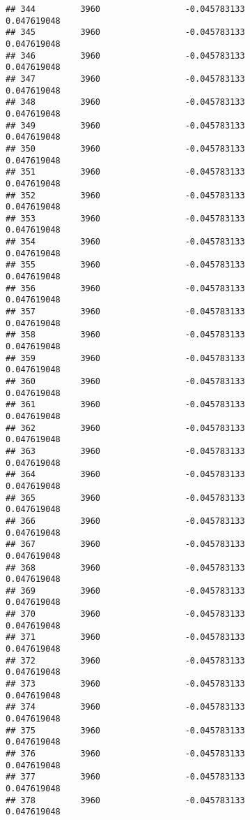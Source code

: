 \documentclass[]{article}
\begin{document}
\begin{verbatim}
## 344         3960                 -0.045783133                0.047619048
## 345         3960                 -0.045783133                0.047619048
## 346         3960                 -0.045783133                0.047619048
## 347         3960                 -0.045783133                0.047619048
## 348         3960                 -0.045783133                0.047619048
## 349         3960                 -0.045783133                0.047619048
## 350         3960                 -0.045783133                0.047619048
## 351         3960                 -0.045783133                0.047619048
## 352         3960                 -0.045783133                0.047619048
## 353         3960                 -0.045783133                0.047619048
## 354         3960                 -0.045783133                0.047619048
## 355         3960                 -0.045783133                0.047619048
## 356         3960                 -0.045783133                0.047619048
## 357         3960                 -0.045783133                0.047619048
## 358         3960                 -0.045783133                0.047619048
## 359         3960                 -0.045783133                0.047619048
## 360         3960                 -0.045783133                0.047619048
## 361         3960                 -0.045783133                0.047619048
## 362         3960                 -0.045783133                0.047619048
## 363         3960                 -0.045783133                0.047619048
## 364         3960                 -0.045783133                0.047619048
## 365         3960                 -0.045783133                0.047619048
## 366         3960                 -0.045783133                0.047619048
## 367         3960                 -0.045783133                0.047619048
## 368         3960                 -0.045783133                0.047619048
## 369         3960                 -0.045783133                0.047619048
## 370         3960                 -0.045783133                0.047619048
## 371         3960                 -0.045783133                0.047619048
## 372         3960                 -0.045783133                0.047619048
## 373         3960                 -0.045783133                0.047619048
## 374         3960                 -0.045783133                0.047619048
## 375         3960                 -0.045783133                0.047619048
## 376         3960                 -0.045783133                0.047619048
## 377         3960                 -0.045783133                0.047619048
## 378         3960                 -0.045783133                0.047619048

\end{verbatim}
\end{document}
